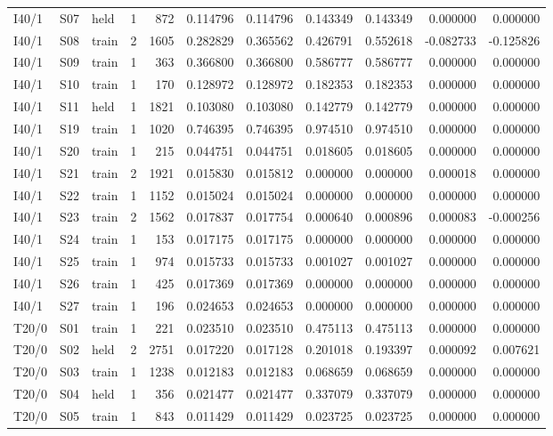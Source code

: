 {\begin{longtable}{@{}lllrrrrrrrr@{}}
I40/1 & S07 & held & 1 & 872 & 0.114796 & 0.114796 & 0.143349 & 0.143349 & 0.000000 & 0.000000 \\
I40/1 & S08 & train & 2 & 1605 & 0.282829 & 0.365562 & 0.426791 & 0.552618 & -0.082733 & -0.125826 \\
I40/1 & S09 & train & 1 & 363 & 0.366800 & 0.366800 & 0.586777 & 0.586777 & 0.000000 & 0.000000 \\
I40/1 & S10 & train & 1 & 170 & 0.128972 & 0.128972 & 0.182353 & 0.182353 & 0.000000 & 0.000000 \\
I40/1 & S11 & held & 1 & 1821 & 0.103080 & 0.103080 & 0.142779 & 0.142779 & 0.000000 & 0.000000 \\
I40/1 & S19 & train & 1 & 1020 & 0.746395 & 0.746395 & 0.974510 & 0.974510 & 0.000000 & 0.000000 \\
I40/1 & S20 & train & 1 & 215 & 0.044751 & 0.044751 & 0.018605 & 0.018605 & 0.000000 & 0.000000 \\
I40/1 & S21 & train & 2 & 1921 & 0.015830 & 0.015812 & 0.000000 & 0.000000 & 0.000018 & 0.000000 \\
I40/1 & S22 & train & 1 & 1152 & 0.015024 & 0.015024 & 0.000000 & 0.000000 & 0.000000 & 0.000000 \\
I40/1 & S23 & train & 2 & 1562 & 0.017837 & 0.017754 & 0.000640 & 0.000896 & 0.000083 & -0.000256 \\
I40/1 & S24 & train & 1 & 153 & 0.017175 & 0.017175 & 0.000000 & 0.000000 & 0.000000 & 0.000000 \\
I40/1 & S25 & train & 1 & 974 & 0.015733 & 0.015733 & 0.001027 & 0.001027 & 0.000000 & 0.000000 \\
I40/1 & S26 & train & 1 & 425 & 0.017369 & 0.017369 & 0.000000 & 0.000000 & 0.000000 & 0.000000 \\
I40/1 & S27 & train & 1 & 196 & 0.024653 & 0.024653 & 0.000000 & 0.000000 & 0.000000 & 0.000000 \\
T20/0 & S01 & train & 1 & 221 & 0.023510 & 0.023510 & 0.475113 & 0.475113 & 0.000000 & 0.000000 \\
T20/0 & S02 & held & 2 & 2751 & 0.017220 & 0.017128 & 0.201018 & 0.193397 & 0.000092 & 0.007621 \\
T20/0 & S03 & train & 1 & 1238 & 0.012183 & 0.012183 & 0.068659 & 0.068659 & 0.000000 & 0.000000 \\
T20/0 & S04 & held & 1 & 356 & 0.021477 & 0.021477 & 0.337079 & 0.337079 & 0.000000 & 0.000000 \\
T20/0 & S05 & train & 1 & 843 & 0.011429 & 0.011429 & 0.023725 & 0.023725 & 0.000000 & 0.000000 \\

\end{longtable}}
